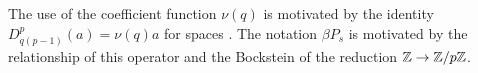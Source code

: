 
\begin{remark*}
	The use of the coefficient function $\nu(q)$ is motivated by the identity $D_{q(p-1)}^p(a) = \nu(q)a$ for spaces \cite[(6.1)]{steenrod1953cyclic}.
	The notation $\beta P_s$ is motivated by the relationship of this operator and the Bockstein of the reduction $\mathbb{Z} \to \mathbb{Z}/p\mathbb{Z}$.
\end{remark*}